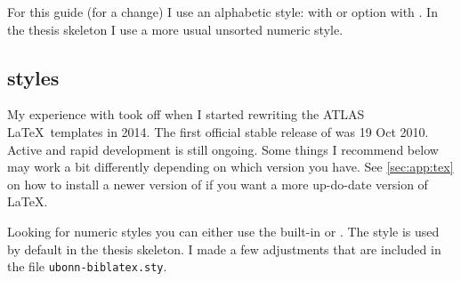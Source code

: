 For this guide (for a change) I use an alphabetic style:
 with \BibTeX{} or option  with
. In the thesis skeleton I use a more usual unsorted
numeric style.


\subsection{ styles}%
\label{sec:ref:bbx}

My experience with  took off 
when I started rewriting the ATLAS \LaTeX\ templates in 2014.
The first official stable release of  was 19 Oct 2010.
Active and rapid development is still ongoing.
Some things I recommend below may work a bit differently depending on which version
you have. See \cref{sec:app:tex} on how to install a newer
version of \TeXLive if you want a more up-do-date version of \LaTeX.

Looking for numeric styles you can either use the built-in
 or .
The  style is used by default in the thesis skeleton.
I made a few adjustments that are included in the file
\texttt{ubonn-biblatex.sty}.

